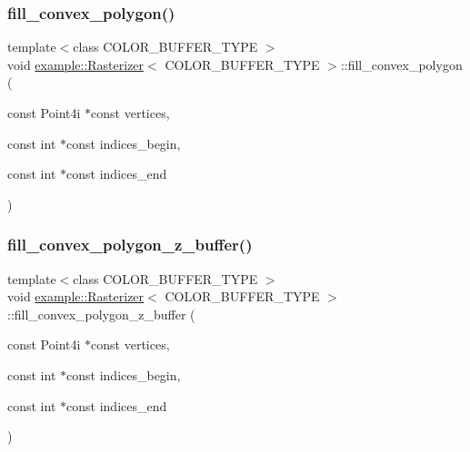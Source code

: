 \subsubsection{\texorpdfstring{fill\_convex\_polygon()}{fill\_convex\_polygon()}}
{\footnotesize\ttfamily template$<$class C\+O\+L\+O\+R\+\_\+\+B\+U\+F\+F\+E\+R\+\_\+\+T\+Y\+PE $>$ \\
void \mbox{\hyperlink{classexample_1_1_rasterizer}{example\+::\+Rasterizer}}$<$ C\+O\+L\+O\+R\+\_\+\+B\+U\+F\+F\+E\+R\+\_\+\+T\+Y\+PE $>$\+::fill\+\_\+convex\+\_\+polygon (\begin{DoxyParamCaption}\item[{const Point4i $\ast$const}]{vertices,  }\item[{const int $\ast$const}]{indices\+\_\+begin,  }\item[{const int $\ast$const}]{indices\+\_\+end }\end{DoxyParamCaption})}

\mbox{\label{classexample_1_1_rasterizer_a54faf27d2f9ac25948051944bd5b5d0d}} 
\subsubsection{\texorpdfstring{fill\_convex\_polygon\_z\_buffer()}{fill\_convex\_polygon\_z\_buffer()}}
{\footnotesize\ttfamily template$<$class C\+O\+L\+O\+R\+\_\+\+B\+U\+F\+F\+E\+R\+\_\+\+T\+Y\+PE $>$ \\
void \mbox{\hyperlink{classexample_1_1_rasterizer}{example\+::\+Rasterizer}}$<$ C\+O\+L\+O\+R\+\_\+\+B\+U\+F\+F\+E\+R\+\_\+\+T\+Y\+PE $>$\+::fill\+\_\+convex\+\_\+polygon\+\_\+z\+\_\+buffer (\begin{DoxyParamCaption}\item[{const Point4i $\ast$const}]{vertices,  }\item[{const int $\ast$const}]{indices\+\_\+begin,  }\item[{const int $\ast$const}]{indices\+\_\+end }\end{DoxyParamCaption})}

\mbox{\label{classexample_1_1_rasterizer_a21b94302fba144872555e84af362f87c}} 
